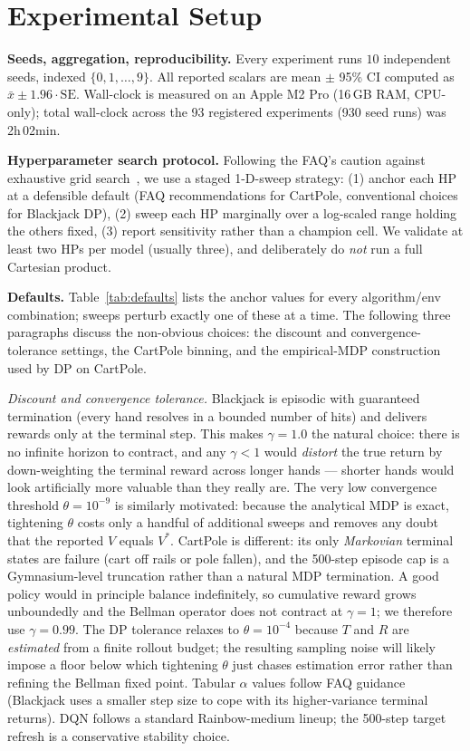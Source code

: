 \documentclass[conference]{IEEEtran}
\begin{document}
\section{Experimental Setup}
\label{sec:setup}

\textbf{Seeds, aggregation, reproducibility.} Every experiment runs
$10$ independent seeds, indexed $\{0, 1, \ldots, 9\}$.
All reported scalars are mean $\pm$ 95\% CI computed as $\bar{x} \pm 1.96
\cdot \text{SE}$. Wall-clock is measured on an Apple M2 Pro (16\,GB RAM,
CPU-only); total wall-clock across the 93 registered experiments (930 seed
runs) was 2h\,02min.

\textbf{Hyperparameter search protocol.} Following the FAQ's caution
against exhaustive grid search~\cite{cartpole_faq}, we use a staged
1-D-sweep strategy: (1) anchor each HP at a defensible default (FAQ
recommendations for CartPole, conventional choices for Blackjack DP),
(2) sweep each HP marginally over a log-scaled range holding the others
fixed, (3) report sensitivity rather than a champion cell. We validate
at least two HPs per model (usually three), and deliberately do
\emph{not} run a full Cartesian product.

\textbf{Defaults.} Table~\ref{tab:defaults} lists the anchor values
for every algorithm/env combination; sweeps perturb exactly one of
these at a time. The following three paragraphs discuss the
non-obvious choices: the discount and convergence-tolerance
settings, the CartPole binning, and the empirical-MDP construction
used by DP on CartPole.

\textit{Discount and convergence tolerance.}
Blackjack is episodic with guaranteed termination (every hand
resolves in a bounded number of hits) and delivers rewards only at
the terminal step. This makes $\gamma = 1.0$ the natural choice:
there is no infinite horizon to contract, and any $\gamma < 1$
would \emph{distort} the true return by down-weighting the terminal
reward across longer hands --- shorter hands would look artificially
more valuable than they really are. The very low convergence
threshold $\theta = 10^{-9}$ is similarly motivated: because the
analytical MDP is exact, tightening $\theta$ costs only a handful of
additional sweeps and removes any doubt that the reported $V$ equals
$V^*$. CartPole is different: its only \emph{Markovian} terminal
states are failure (cart off rails or pole fallen), and the 500-step
episode cap is a Gymnasium-level truncation rather than a natural
MDP termination. A good policy would in principle balance
indefinitely, so cumulative reward grows unboundedly and the Bellman
operator does not contract at $\gamma = 1$; we therefore use
$\gamma = 0.99$. The DP tolerance relaxes to $\theta = 10^{-4}$
because $T$ and $R$ are \emph{estimated} from a finite rollout
budget; the resulting sampling noise will likely impose a floor
below which tightening $\theta$ just chases estimation error rather
than refining the Bellman fixed point.
Tabular $\alpha$ values follow FAQ guidance (Blackjack uses a smaller
step size to cope with its higher-variance terminal returns). DQN
follows a standard Rainbow-medium lineup; the 500-step target
refresh is a conservative stability choice.
\end{document}
